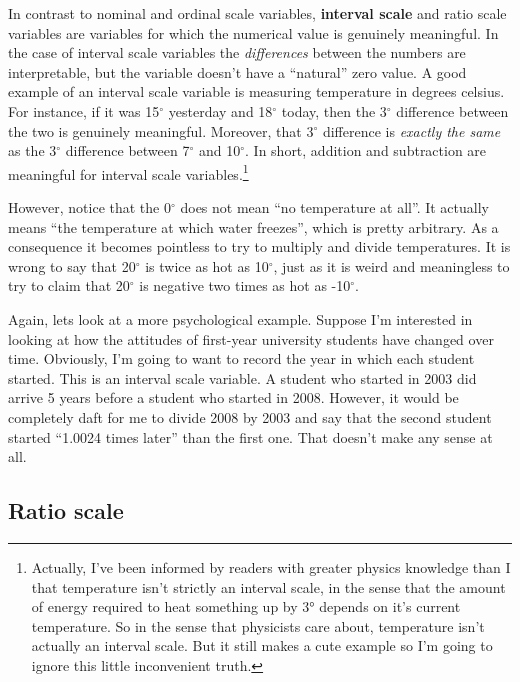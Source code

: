 \documentclass[
  letterpaper,
]{book}
\begin{document}
In contrast to nominal and ordinal scale variables, \textbf{interval
scale} and ratio scale variables are variables for which the numerical
value is genuinely meaningful. In the case of interval scale variables
the \emph{differences} between the numbers are interpretable, but the
variable doesn't have a ``natural'' zero value. A good example of an
interval scale variable is measuring temperature in degrees celsius. For
instance, if it was 15\(^{\circ}\) yesterday and 18\(^{\circ}\) today,
then the 3\(^{\circ}\) difference between the two is genuinely
meaningful. Moreover, that 3\(^{\circ}\) difference is \emph{exactly the
same} as the 3\(^{\circ}\) difference between 7\(^{\circ}\) and
10\(^{\circ}\). In short, addition and subtraction are meaningful for
interval scale variables.\footnote{Actually, I've been informed by
  readers with greater physics knowledge than I that temperature isn't
  strictly an interval scale, in the sense that the amount of energy
  required to heat something up by 3° depends on it's current
  temperature. So in the sense that physicists care about, temperature
  isn't actually an interval scale. But it still makes a cute example so
  I'm going to ignore this little inconvenient truth.}

However, notice that the 0\(^{\circ}\) does not mean ``no temperature at
all''. It actually means ``the temperature at which water freezes'',
which is pretty arbitrary. As a consequence it becomes pointless to try
to multiply and divide temperatures. It is wrong to say that
20\(^{\circ}\) is twice as hot as 10\(^{\circ}\), just as it is weird
and meaningless to try to claim that 20\(^{\circ}\) is negative two
times as hot as -10\(^{\circ}\).

Again, lets look at a more psychological example. Suppose I'm interested
in looking at how the attitudes of first-year university students have
changed over time. Obviously, I'm going to want to record the year in
which each student started. This is an interval scale variable. A
student who started in 2003 did arrive 5 years before a student who
started in 2008. However, it would be completely daft for me to divide
2008 by 2003 and say that the second student started ``1.0024 times
later'' than the first one. That doesn't make any sense at all.

\hypertarget{ratio-scale}{%
\subsection{Ratio scale}\label{ratio-scale}}
\end{document}
